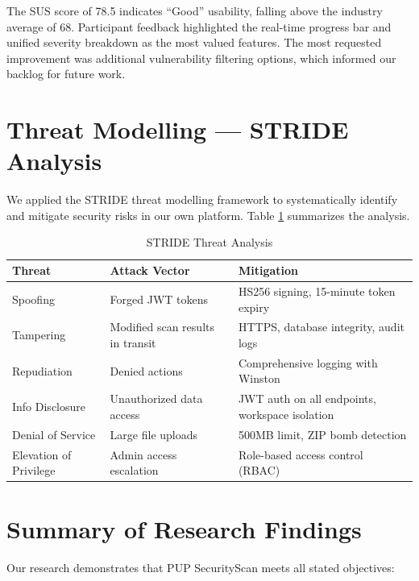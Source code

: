 \documentclass[12pt,a4paper]{report}
\begin{document}
The SUS score of 78.5 indicates ``Good'' usability, falling above the industry average of 68. Participant feedback highlighted the real-time progress bar and unified severity breakdown as the most valued features. The most requested improvement was additional vulnerability filtering options, which informed our backlog for future work.

\section{Threat Modelling — STRIDE Analysis}

We applied the STRIDE threat modelling framework to systematically identify and mitigate security risks in our own platform. Table \ref{tab:stride} summarizes the analysis.

\begin{table}[H]
\centering
\caption{STRIDE Threat Analysis}
\label{tab:stride}
\begin{tabular}{|p{2cm}|p{4cm}|p{5cm}|}
\hline
\textbf{Threat} & \textbf{Attack Vector} & \textbf{Mitigation} \\
\hline
Spoofing & Forged JWT tokens & HS256 signing, 15-minute token expiry \\
\hline
Tampering & Modified scan results in transit & HTTPS, database integrity, audit logs \\
\hline
Repudiation & Denied actions & Comprehensive logging with Winston \\
\hline
Info Disclosure & Unauthorized data access & JWT auth on all endpoints, workspace isolation \\
\hline
Denial of Service & Large file uploads & 500MB limit, ZIP bomb detection \\
\hline
Elevation of Privilege & Admin access escalation & Role-based access control (RBAC) \\
\hline
\end{tabular}
\end{table}

\section{Summary of Research Findings}

Our research demonstrates that PUP SecurityScan meets all stated objectives:
\end{document}
